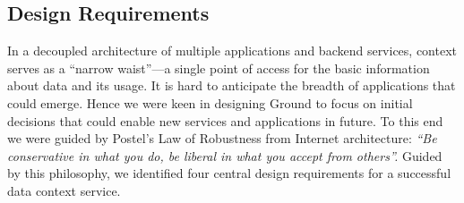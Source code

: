 \documentclass{sig-alternate}
\begin{document}







\subsection{Design Requirements}


In a decoupled architecture of multiple applications and backend services, context serves as a ``narrow waist''---a single point of access for the basic information about data and its usage. It is hard to anticipate the breadth of applications that could emerge.
Hence we were keen in designing Ground to focus on initial decisions that could enable new services and applications in future. 
To this end we were guided by Postel's Law of Robustness from Internet architecture: \emph{``Be conservative in what you do, be liberal in what you accept from others''.}  
Guided by this philosophy, we identified four central design requirements for a successful data context service.
\end{document}
